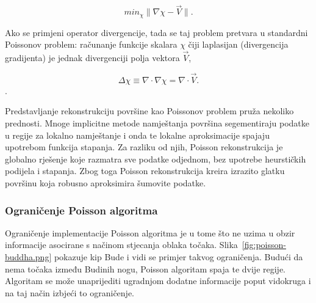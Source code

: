 \begin{equation*}
min_\chi \|\nabla\chi - \vec{V}\|.
\end{equation*}

Ako se primjeni operator divergencije, tada se taj problem pretvara u
standardni Poissonov problem: računanje funkcije skalara \(\chi\) čiji
laplasijan (divergencija gradijenta) je jednak divergenciji polja
vektora \(\vec{V}\),

\begin{equation*}
\Delta \chi \equiv \nabla \cdot \nabla\chi = \nabla \cdot \vec{V}.
\end{equation*}.

Predstavljanje rekonstrukciju površine kao Poissonov problem pruža
nekoliko prednosti. Mnoge implicitne metode namještanja površina
segementiraju podatke u regije za lokalno namještanje i onda te lokalne
aproksimacije spajaju upotrebom funkcija stapanja. Za razliku od njih,
Poisson rekonstrukcija je globalno rješenje koje razmatra sve podatke
odjednom, bez upotrebe heurstičkih podijela i stapanja. Zbog toga
Poisson rekonstrukcija kreira izrazito glatku površinu koja robusno
aproksimira šumovite podatke.  


\subsubsection{Ograničenje Poisson algoritma} %
\label{ssub:Ograničenje Poisson algoritma}

Ograničenje implementacije Poisson algoritma je u tome što ne uzima u
obzir informacije asocirane s načinom stjecanja oblaka točaka.
Slika~\ref{fig:poisson-buddha.png} pokazuje kip Bude i vidi se primjer takvog
ograničenja. Budući da nema točaka između Budinih nogu, Poisson
algoritam spaja te dvije regije. Algoritam se može unaprijediti
ugradnjom dodatne informacije poput vidokruga i na taj način izbjeći to
ograničenje.

